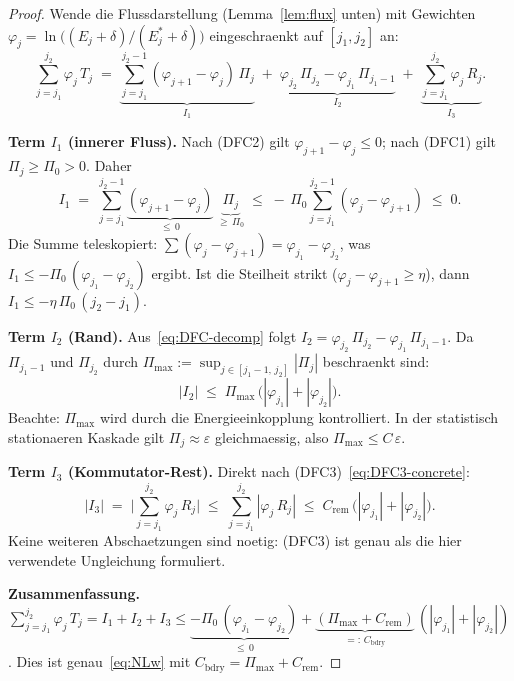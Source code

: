 \documentclass[12pt,a4paper]{article}
\theoremstyle{definition}
\theoremstyle{plain}
\theoremstyle{remark}
\begin{document}
\begin{proof}
Wende die Flussdarstellung (Lemma~\ref{lem:flux} unten) mit Gewichten
$\varphi_j = \ln\bigl((E_j+\delta)/(E_j^*+\delta)\bigr)$
eingeschraenkt auf $[j_1, j_2]$ an:
\begin{equation}\label{eq:DFC-decomp}
  \sum_{j=j_1}^{j_2} \varphi_j\,T_j
  \;=\;
  \underbrace{\sum_{j=j_1}^{j_2-1}
    (\varphi_{j+1} - \varphi_j)\,\Pi_j}_{I_1}
  \;+\;
  \underbrace{\varphi_{j_2}\,\Pi_{j_2}
    - \varphi_{j_1}\,\Pi_{j_1-1}}_{I_2}
  \;+\;
  \underbrace{\sum_{j=j_1}^{j_2} \varphi_j\,R_j}_{I_3}.
\end{equation}

\textbf{Term $I_1$ (innerer Fluss).}\;
Nach (DFC2) gilt $\varphi_{j+1} - \varphi_j \le 0$; nach (DFC1)
gilt $\Pi_j \ge \Pi_0 > 0$. Daher
\[
  I_1
  \;=\; \sum_{j=j_1}^{j_2-1}
    \underbrace{(\varphi_{j+1} - \varphi_j)}_{\le\, 0}\;
    \underbrace{\Pi_j}_{\ge\, \Pi_0}
  \;\le\; -\,\Pi_0
    \sum_{j=j_1}^{j_2-1}(\varphi_j - \varphi_{j+1})
  \;\le\; 0.
\]
Die Summe teleskopiert: $\sum(\varphi_j - \varphi_{j+1}) =
\varphi_{j_1} - \varphi_{j_2}$, was
$I_1 \le -\Pi_0\,(\varphi_{j_1} - \varphi_{j_2})$ ergibt.
Ist die Steilheit strikt ($\varphi_j - \varphi_{j+1} \ge \eta$),
dann $I_1 \le -\eta\,\Pi_0\,(j_2 - j_1)$.

\textbf{Term $I_2$ (Rand).}\;
Aus~\eqref{eq:DFC-decomp} folgt $I_2 = \varphi_{j_2}\,\Pi_{j_2}
- \varphi_{j_1}\,\Pi_{j_1-1}$. Da $\Pi_{j_1-1}$ und $\Pi_{j_2}$
durch $\Pi_{\max} := \sup_{j \in [j_1-1,\,j_2]}|\Pi_j|$ beschraenkt sind:
\begin{equation}\label{eq:I2-bound}
  |I_2|
  \;\le\;
  \Pi_{\max}\,\bigl(|\varphi_{j_1}| + |\varphi_{j_2}|\bigr).
\end{equation}
Beachte: $\Pi_{\max}$ wird durch die Energieeinkopplung kontrolliert. In
der statistisch stationaeren Kaskade gilt $\Pi_j \approx \varepsilon$
gleichmaessig, also $\Pi_{\max} \le C\,\varepsilon$.

\textbf{Term $I_3$ (Kommutator-Rest).}\;
Direkt nach (DFC3)~\eqref{eq:DFC3-concrete}:
\begin{equation}\label{eq:I3-bound}
  |I_3|
  \;=\;
  \biggl|\sum_{j=j_1}^{j_2} \varphi_j\,R_j\biggr|
  \;\le\;
  \sum_{j=j_1}^{j_2} |\varphi_j\,R_j|
  \;\le\;
  C_{\mathrm{rem}}\,\bigl(|\varphi_{j_1}| + |\varphi_{j_2}|\bigr).
\end{equation}
Keine weiteren Abschaetzungen sind noetig: (DFC3) ist genau als die
hier verwendete Ungleichung formuliert.

\medskip\noindent
\textbf{Zusammenfassung.}\;
$\sum_{j=j_1}^{j_2} \varphi_j\,T_j
= I_1 + I_2 + I_3
\le \underbrace{-\Pi_0\,(\varphi_{j_1}-\varphi_{j_2})}_{\le\,0}
+ \underbrace{(\Pi_{\max} + C_{\mathrm{rem}})}_
  {=:\,C_{\mathrm{bdry}}}
\,(|\varphi_{j_1}|+|\varphi_{j_2}|)$.
Dies ist genau~\eqref{eq:NLw} mit
$C_{\mathrm{bdry}} = \Pi_{\max} + C_{\mathrm{rem}}$.
\end{proof}
\end{document}
